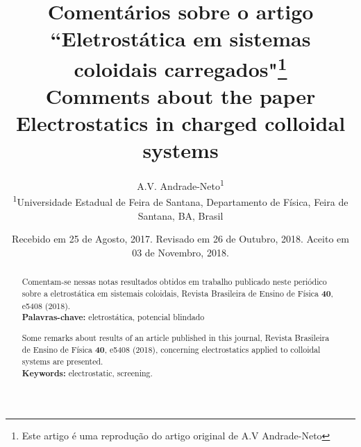 \documentclass[brazilian,10.7pt,a4paper]{article}
\title{\textbf{Comentários sobre o artigo ``Eletrostática em sistemas coloidais carregados"}\footnote{Este artigo é uma reprodução do artigo original de A.V Andrade-Neto}\\
\vspace{5pt}\small{\textbf{Comments about the paper Electrostatics in charged colloidal systems}}\vspace{-3pt}}
\author{A.V. Andrade-Neto\textsuperscript{1}\vspace{7pt}\\ 
\small{\textsuperscript{1}Universidade Estadual de Feira de Santana, Departamento de Física, Feira de Santana, BA, Brasil}\vspace{6pt}}
\date{\small{Recebido em 25 de Agosto, 2017. Revisado em 26 de Outubro, 2018. Aceito em 03 de Novembro, 2018.}\vspace{-45pt}}
\begin{document}
\renewcommand{\abstractname}{}
\frenchspacing
\maketitle
\thispagestyle{empty}
\begin{abstract}
Comentam-se nessas notas resultados obtidos em trabalho publicado neste periódico sobre a eletrostática em
sistemais coloidais, Revista Brasileira de Ensino de Física \textbf{40}, e5408 (2018).\\
\textbf{Palavras-chave:} eletrostática, potencial blindado\\
\par
Some remarks about results of an article published in this journal, Revista Brasileira de Ensino de Física \textbf{40},
e5408 (2018), concerning electrostatics applied to colloidal systems are presented.\\
\textbf{Keywords:} electrostatic, screening.\\
\end{abstract}
\end{document}

